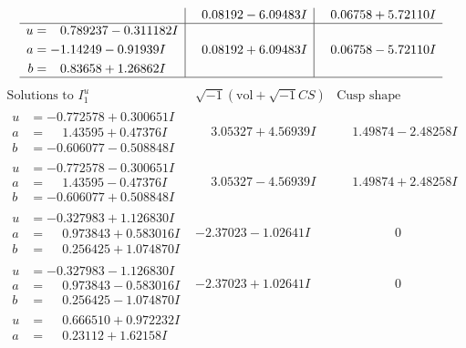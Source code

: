 \documentclass[1p]{elsarticle_modified}
\theoremstyle{definition}
\newcommand{\I}{\sqrt{-1}}
\begin{document}
$$\begin{array}{c|c|c}
 & \phantom{-}0.08192 - 6.09483 I & \phantom{-}0.06758 + 5.72110 I \\ \hline\begin{aligned}
u &= \phantom{-}0.789237 - 0.311182 I \\
a &= -1.14249 - 0.91939 I \\
b &= \phantom{-}0.83658 + 1.26862 I\end{aligned}
 & \phantom{-}0.08192 + 6.09483 I & \phantom{-}0.06758 - 5.72110 I\\
 \hline 
 \end{array}$$\newpage$$\begin{array}{c|c|c}  
\text{Solutions to }I^u_{1}& \I (\text{vol} + \sqrt{-1}CS) & \text{Cusp shape}\\
 \hline 
\begin{aligned}
u &= -0.772578 + 0.300651 I \\
a &= \phantom{-}1.43595 + 0.47376 I \\
b &= -0.606077 - 0.508848 I\end{aligned}
 & \phantom{-}3.05327 + 4.56939 I & \phantom{-}1.49874 - 2.48258 I \\ \hline\begin{aligned}
u &= -0.772578 - 0.300651 I \\
a &= \phantom{-}1.43595 - 0.47376 I \\
b &= -0.606077 + 0.508848 I\end{aligned}
 & \phantom{-}3.05327 - 4.56939 I & \phantom{-}1.49874 + 2.48258 I \\ \hline\begin{aligned}
u &= -0.327983 + 1.126830 I \\
a &= \phantom{-}0.973843 + 0.583016 I \\
b &= \phantom{-}0.256425 + 1.074870 I\end{aligned}
 & -2.37023 - 1.02641 I & \phantom{-0.000000 } 0 \\ \hline\begin{aligned}
u &= -0.327983 - 1.126830 I \\
a &= \phantom{-}0.973843 - 0.583016 I \\
b &= \phantom{-}0.256425 - 1.074870 I\end{aligned}
 & -2.37023 + 1.02641 I & \phantom{-0.000000 } 0 \\ \hline\begin{aligned}
u &= \phantom{-}0.666510 + 0.972232 I \\
a &= \phantom{-}0.23112 + 1.62158 I \\

\end{aligned}
\end{array}$$
\end{document}
